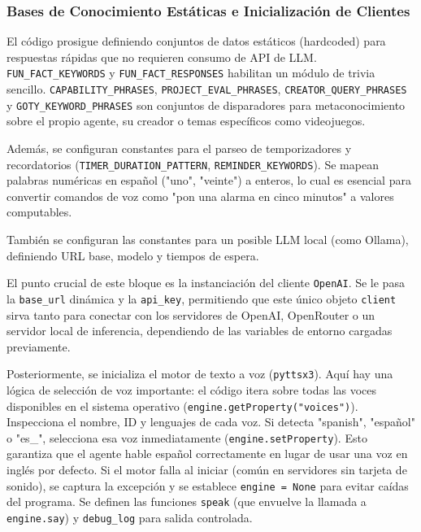 \documentclass[letterpaper,12pt]{article}
\begin{document}
\subsubsection{Bases de Conocimiento Estáticas e Inicialización de Clientes}

El código prosigue definiendo conjuntos de datos estáticos (hardcoded) para respuestas rápidas que no requieren consumo de API de LLM. \texttt{FUN\_FACT\_KEYWORDS} y \texttt{FUN\_FACT\_RESPONSES} habilitan un módulo de trivia sencillo. \texttt{CAPABILITY\_PHRASES}, \texttt{PROJECT\_EVAL\_PHRASES}, \texttt{CREATOR\_QUERY\_PHRASES} y \texttt{GOTY\_KEYWORD\_PHRASES} son conjuntos de disparadores para metaconocimiento sobre el propio agente, su creador o temas específicos como videojuegos.

Además, se configuran constantes para el parseo de temporizadores y recordatorios (\texttt{TIMER\_DURATION\_PATTERN}, \texttt{REMINDER\_KEYWORDS}). Se mapean palabras numéricas en español ("uno", "veinte") a enteros, lo cual es esencial para convertir comandos de voz como "pon una alarma en cinco minutos" a valores computables.

También se configuran las constantes para un posible LLM local (como Ollama), definiendo URL base, modelo y tiempos de espera.

El punto crucial de este bloque es la instanciación del cliente \texttt{OpenAI}. Se le pasa la \texttt{base\_url} dinámica y la \texttt{api\_key}, permitiendo que este único objeto \texttt{client} sirva tanto para conectar con los servidores de OpenAI, OpenRouter o un servidor local de inferencia, dependiendo de las variables de entorno cargadas previamente.

Posteriormente, se inicializa el motor de texto a voz (\texttt{pyttsx3}). Aquí hay una lógica de selección de voz importante: el código itera sobre todas las voces disponibles en el sistema operativo (\texttt{engine.getProperty("voices")}). Inspecciona el nombre, ID y lenguajes de cada voz. Si detecta "spanish", "español" o "es\_", selecciona esa voz inmediatamente (\texttt{engine.setProperty}). Esto garantiza que el agente hable español correctamente en lugar de usar una voz en inglés por defecto. Si el motor falla al iniciar (común en servidores sin tarjeta de sonido), se captura la excepción y se establece \texttt{engine = None} para evitar caídas del programa. Se definen las funciones \texttt{speak} (que envuelve la llamada a \texttt{engine.say}) y \texttt{debug\_log} para salida controlada.
\end{document}
